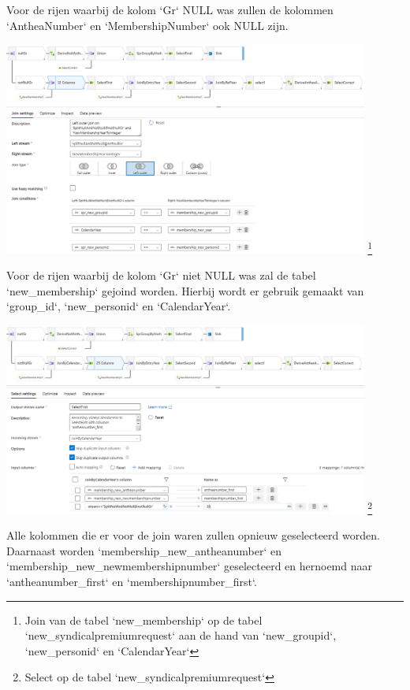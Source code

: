 Voor de rijen waarbij de kolom `Gr` NULL was zullen de kolommen `AntheaNumber` en `MembershipNumber` ook NULL zijn.

\begin{center}
    \includegraphics[width=0.9\textwidth]{./graphics/adf/member_3.png}
    \footnote{Join van de tabel `new\_membership` op de tabel `new\_syndicalpremiumrequest` aan de hand van `new\_groupid`, `new\_personid` en `CalendarYear`}
\end{center}

Voor de rijen waarbij de kolom `Gr` niet NULL was zal de tabel `new\_membership` gejoind worden. Hierbij wordt er gebruik gemaakt van `group\_id`, `new\_personid` en `CalendarYear`.

\begin{center}
    \includegraphics[width=0.9\textwidth]{./graphics/adf/member_4.png}
    \footnote{Select op de tabel `new\_syndicalpremiumrequest`}
\end{center}

Alle kolommen die er voor de join waren zullen opnieuw geselecteerd worden. Daarnaast worden `membership\_new\_antheanumber` en `membership\_new\_newmembershipnumber` geselecteerd en hernoemd naar `antheanumber\_first` en `membershipnumber\_first`.

